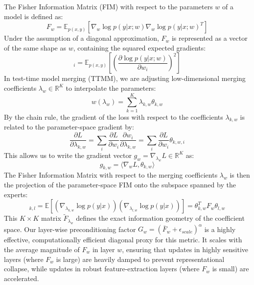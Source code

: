 \documentclass{article}
\theoremstyle{plain}
\theoremstyle{definition}
\theoremstyle{remark}
\begin{document}
The Fisher Information Matrix (FIM) with respect to the parameters $w$ of a model is defined as:
\begin{equation}
  F_w = \mathbb{E}_{p(x, y)} \left[ \nabla_w \log p(y|x; w) \nabla_w \log p(y|x; w)^T \right]
\end{equation}
Under the assumption of a diagonal approximation, $F_w$ is represented as a vector of the same shape as $w$, containing the squared expected gradients:
\begin{equation}
  [F_w]_i = \mathbb{E}_{p(x, y)} \left[ \left( \frac{\partial \log p(y|x; w)}{\partial w_i} \right)^2 \right]
\end{equation}
In test-time model merging (TTMM), we are adjusting low-dimensional merging coefficients $\lambda_w \in \mathbb{R}^K$ to interpolate the parameters:
\begin{equation}
  w(\lambda_w) = \sum_{k=1}^K \lambda_{k, w} \theta_{k, w}
\end{equation}
By the chain rule, the gradient of the loss with respect to the coefficients $\lambda_{k, w}$ is related to the parameter-space gradient by:
\begin{equation}
  \frac{\partial L}{\partial \lambda_{k, w}} = \sum_i \frac{\partial L}{\partial w_i} \frac{\partial w_i}{\partial \lambda_{k, w}} = \sum_i \frac{\partial L}{\partial w_i} \theta_{k, w, i}
\end{equation}
This allows us to write the gradient vector $g_w = \nabla_{\lambda_w} L \in \mathbb{R}^K$ as:
\begin{equation}
  g_{k, w} = \langle \nabla_w L, \theta_{k, w} \rangle
\end{equation}
The Fisher Information Matrix with respect to the merging coefficients $\lambda_w$ is then the projection of the parameter-space FIM onto the subspace spanned by the experts:
\begin{equation}
  [\tilde{F}_{\lambda_w}]_{k, l} = \mathbb{E} \left[ \left( \nabla_{\lambda_{k, w}} \log p(y|x) \right) \left( \nabla_{\lambda_{l, w}} \log p(y|x) \right) \right] = \theta_{k, w}^T F_w \theta_{l, w}
\end{equation}
This $K \times K$ matrix $\tilde{F}_{\lambda_w}$ defines the exact information geometry of the coefficient space. Our layer-wise preconditioning factor $G_w = (\bar{F}_w + \epsilon_{scale})^\alpha$ is a highly effective, computationally efficient diagonal proxy for this metric. It scales with the average magnitude of $F_w$ in layer $w$, ensuring that updates in highly sensitive layers (where $F_w$ is large) are heavily damped to prevent representational collapse, while updates in robust feature-extraction layers (where $F_w$ is small) are accelerated.
\end{document}
